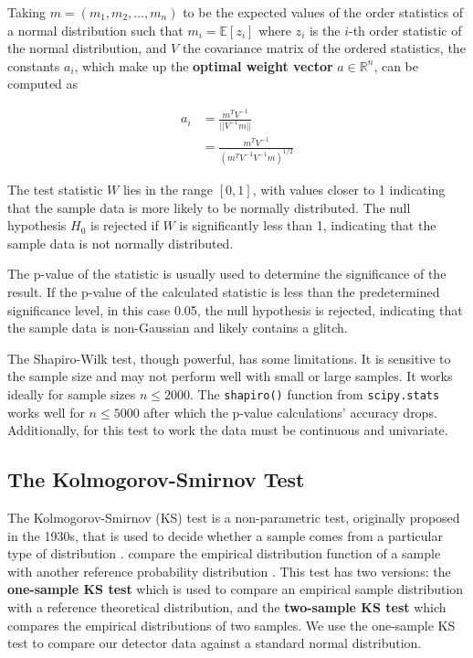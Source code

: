\documentclass[12pt]{article}
\begin{document}
\medskip
\noindent Taking $m = (m_1, m_2, \ldots, m_n)$ to be the expected values of the order statistics of a normal distribution such that $m_i = \mathbb{E}[z_i]$ where $z_i$ is the $i$-th order statistic of the normal distribution, and $V$ the covariance matrix of the ordered statistics, the constants $a_i$, which make up the \textbf{optimal weight vector} $a \in \mathbb{R}^n$, can be computed as

\begin{align}
    a_i &= \frac{m^T V^{-1}}{||V^{-1} m||} \\
        &= \frac{m^T V^{-1}}{(m^T V^{-1}V^{-1}m)^{1/2}}
    \label{eq:shapiro_wilk_constants}
\end{align}

\medskip
\noindent The test statistic $W$ lies in the range $[0, 1]$, with values closer to 1 indicating that the sample data is more likely to be normally distributed. The null hypothesis $H_0$ is rejected if $W$ is significantly less than 1, indicating that the sample data is not normally distributed.

\medskip
\noindent The p-value of the statistic is usually used to determine the significance of the result. If the p-value of the calculated statistic is less than the predetermined significance level, in this case 0.05, the null hypothesis is rejected, indicating that the sample data is non-Gaussian and likely contains a glitch.

\medskip
\noindent The Shapiro-Wilk test, though powerful, has some limitations. It is sensitive to the sample size and may not perform well with small or large samples. It works ideally for sample sizes $n \leq 2000$. The \texttt{shapiro()} function from \texttt{scipy.stats} works well for $n \leq 5000$ after which the p-value calculations' accuracy drops. Additionally, for this test to work the data must be continuous and univariate.

\subsection{The Kolmogorov-Smirnov Test}\label{KolmogorovSmirnov}

The Kolmogorov-Smirnov (KS) test is a non-parametric test, originally proposed in the 1930s, that is used to decide whether a sample comes from a particular type of distribution \cite{Kolmogorov_1951, chakravarti1967}. compare the empirical distribution function of a sample with another reference probability distribution . This test has two versions: the \textbf{one-sample KS test} which is used to compare an empirical  sample distribution with a reference theoretical distribution, and the \textbf{two-sample KS test} which compares the empirical distributions of two samples. We use the one-sample KS test to compare our detector data against a standard normal distribution.
\end{document}
